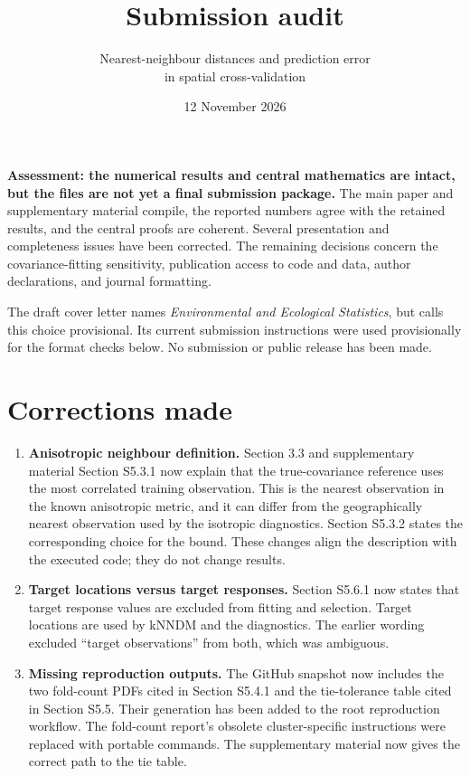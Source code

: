 \documentclass[11pt,a4paper]{article}
\title{Submission audit}
\author{Nearest-neighbour distances and prediction error\\in spatial cross-validation}
\date{12 November 2026}
\begin{document}
\maketitle
\noindent\textbf{Assessment: the numerical results and central mathematics are intact, but the files are not yet a final submission package.} The main paper and supplementary material compile, the reported numbers agree with the retained results, and the central proofs are coherent. Several presentation and completeness issues have been corrected. The remaining decisions concern the covariance-fitting sensitivity, publication access to code and data, author declarations, and journal formatting.

The draft cover letter names \emph{Environmental and Ecological Statistics}, but calls this choice provisional. Its current submission instructions were used provisionally for the format checks below. No submission or public release has been made.

\section*{Corrections made}
\begin{enumerate}
\item \textbf{Anisotropic neighbour definition.} Section 3.3 and supplementary material Section S5.3.1 now explain that the true-covariance reference uses the most correlated training observation. This is the nearest observation in the known anisotropic metric, and it can differ from the geographically nearest observation used by the isotropic diagnostics. Section S5.3.2 states the corresponding choice for the bound. These changes align the description with the executed code; they do not change results.
\item \textbf{Target locations versus target responses.} Section S5.6.1 now states that target response values are excluded from fitting and selection. Target locations are used by kNNDM and the diagnostics. The earlier wording excluded ``target observations'' from both, which was ambiguous.
\item \textbf{Missing reproduction outputs.} The GitHub snapshot now includes the two fold-count PDFs cited in Section S5.4.1 and the tie-tolerance table cited in Section S5.5. Their generation has been added to the root reproduction workflow. The fold-count report's obsolete cluster-specific instructions were replaced with portable commands. The supplementary material now gives the correct path to the tie table.
\end{enumerate}
\end{document}
